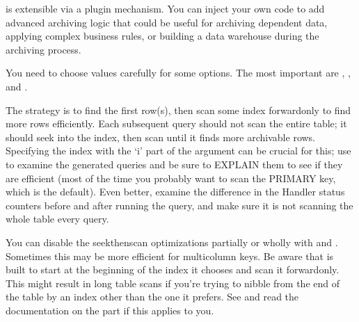 \documentclass[letterpaper,10pt,english]{sphinxmanual}
\begin{document}
 is extensible via a plugin mechanism.  You can inject your own
code to add advanced archiving logic that could be useful for archiving
dependent data, applying complex business rules, or building a data warehouse
during the archiving process.

You need to choose values carefully for some options.  The most important are
{\hyperref[\detokenize{mariadb-archiver:cmdoption-mariadb-archiver-limit}]{}}, {\hyperref[\detokenize{mariadb-archiver:cmdoption-mariadb-archiver-retries}]{}}, and {\hyperref[\detokenize{mariadb-archiver:cmdoption-mariadb-archiver-txn-size}]{}}.

The strategy is to find the first row(s), then scan some index forward\sphinxhyphen{}only to
find more rows efficiently.  Each subsequent query should not scan the entire
table; it should seek into the index, then scan until it finds more archivable
rows.  Specifying the index with the ‘i’ part of the {\hyperref[\detokenize{mariadb-archiver:cmdoption-mariadb-archiver-source}]{}} argument can
be crucial for this; use {\hyperref[\detokenize{mariadb-archiver:cmdoption-mariadb-archiver-dry-run}]{}} to examine the generated queries and be
sure to EXPLAIN them to see if they are efficient (most of the time you probably
want to scan the PRIMARY key, which is the default).  Even better, examine the
difference in the Handler status counters before and after running the query,
and make sure it is not scanning the whole table every query.

You can disable the seek\sphinxhyphen{}then\sphinxhyphen{}scan optimizations partially or wholly with
{\hyperref[\detokenize{mariadb-archiver:cmdoption-mariadb-archiver-no-ascend}]{}} and {\hyperref[\detokenize{mariadb-archiver:cmdoption-mariadb-archiver-ascend-first}]{}}.  Sometimes this may be more efficient
for multi\sphinxhyphen{}column keys.  Be aware that  is built to start at the
beginning of the index it chooses and scan it forward\sphinxhyphen{}only.  This might result
in long table scans if you’re trying to nibble from the end of the table by an
index other than the one it prefers.  See {\hyperref[\detokenize{mariadb-archiver:cmdoption-mariadb-archiver-source}]{}} and read the
documentation on the  part if this applies to you.
\end{document}
